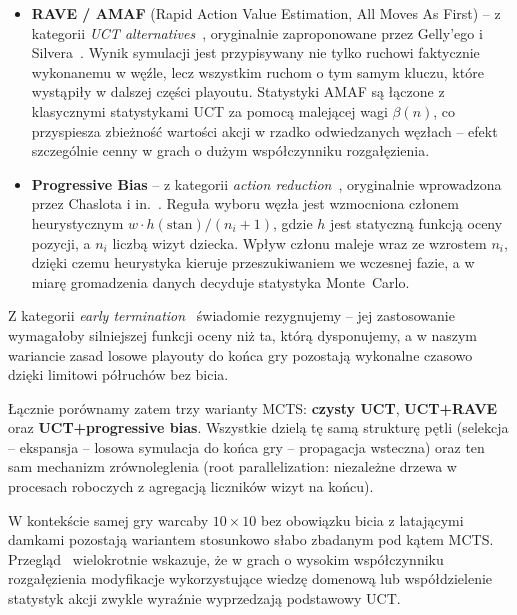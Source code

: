 \documentclass[11pt,a4paper]{article}
\begin{document}
\begin{itemize}
    \item \textbf{RAVE / AMAF} (Rapid Action Value Estimation, All
        Moves As First) -- z kategorii \emph{UCT
        alternatives}~\cite{swiechowski2023mcts}, oryginalnie
        zaproponowane przez Gelly'ego i
        Silvera~\cite{gelly2007combining, gelly2011monte}. Wynik
        symulacji jest przypisywany nie tylko ruchowi faktycznie
        wykonanemu w węźle, lecz wszystkim ruchom o tym samym
        kluczu, które wystąpiły w dalszej części playoutu.
        Statystyki AMAF są łączone z klasycznymi statystykami UCT za
        pomocą malejącej wagi $\beta(n)$, co przyspiesza zbieżność
        wartości akcji w rzadko odwiedzanych węzłach -- efekt
        szczególnie cenny w grach o dużym współczynniku
        rozgałęzienia.
    \item \textbf{Progressive Bias} -- z kategorii \emph{action
        reduction}~\cite{swiechowski2023mcts}, oryginalnie
        wprowadzona przez Chaslota i in.~\cite{chaslot2008progressive}.
        Reguła wyboru węzła jest wzmocniona członem heurystycznym
        $w \cdot h(\text{stan})/(n_i+1)$, gdzie $h$ jest statyczną
        funkcją oceny pozycji, a $n_i$ liczbą wizyt dziecka. Wpływ
        członu maleje wraz ze wzrostem $n_i$, dzięki czemu heurystyka
        kieruje przeszukiwaniem we wczesnej fazie, a w miarę
        gromadzenia danych decyduje statystyka Monte~Carlo.
\end{itemize}

Z kategorii \emph{early termination}~\cite{swiechowski2023mcts}
świadomie rezygnujemy -- jej zastosowanie wymagałoby silniejszej
funkcji oceny niż ta, którą dysponujemy, a w naszym wariancie zasad
losowe playouty do końca gry pozostają wykonalne czasowo dzięki
limitowi półruchów bez bicia.

Łącznie porównamy zatem trzy warianty MCTS: \textbf{czysty UCT},
\textbf{UCT+RAVE} oraz \textbf{UCT+progressive bias}. Wszystkie
dzielą tę samą strukturę pętli (selekcja -- ekspansja -- losowa
symulacja do końca gry -- propagacja wsteczna) oraz ten sam
mechanizm zrównoleglenia (root parallelization: niezależne drzewa w
procesach roboczych z agregacją liczników wizyt na końcu).

W kontekście samej gry warcaby $10\times10$ bez obowiązku bicia z
latającymi damkami pozostają wariantem stosunkowo słabo zbadanym
pod kątem MCTS. Przegląd~\cite{swiechowski2023mcts} wielokrotnie
wskazuje, że w grach o wysokim współczynniku rozgałęzienia
modyfikacje wykorzystujące wiedzę domenową lub współdzielenie
statystyk akcji zwykle wyraźnie wyprzedzają podstawowy UCT.
\end{document}
